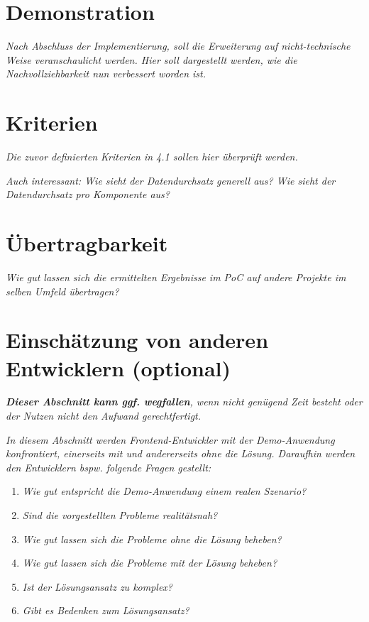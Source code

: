 
\section{Demonstration}

	\textit{Nach Abschluss der Implementierung, soll die Erweiterung auf nicht-technische Weise veranschaulicht werden. Hier soll dargestellt werden, wie die Nachvollziehbarkeit nun verbessert worden ist.}
	
\section{Kriterien}

	\textit{Die zuvor definierten Kriterien in 4.1 sollen hier überprüft werden.}

	\textit{Auch interessant: Wie sieht der Datendurchsatz generell aus? Wie sieht der Datendurchsatz pro Komponente aus?}
	
\section{Übertragbarkeit}
\label{sec:uebertragbarkeit}

	\textit{Wie gut lassen sich die ermittelten Ergebnisse im PoC auf andere Projekte im selben Umfeld übertragen?}
	
\section{Einschätzung von anderen Entwicklern (optional)}

	\textit{\textbf{Dieser Abschnitt kann ggf. wegfallen}, wenn nicht genügend Zeit besteht oder der Nutzen nicht den Aufwand gerechtfertigt.}
	
	\textit{In diesem Abschnitt werden Frontend-Entwickler mit der Demo-Anwendung konfrontiert, einerseits mit und andererseits ohne die Lösung. Daraufhin werden den Entwicklern bspw. folgende Fragen gestellt:}
	
	\begin{enumerate}
		\item \textit{Wie gut entspricht die Demo-Anwendung einem realen Szenario?}
		\item \textit{Sind die vorgestellten Probleme realitätsnah?}
		\item \textit{Wie gut lassen sich die Probleme ohne die Lösung beheben?}
		\item \textit{Wie gut lassen sich die Probleme mit der Lösung beheben?}
		\item \textit{Ist der Lösungsansatz zu komplex?}
		\item \textit{Gibt es Bedenken zum Lösungsansatz?}
	\end{enumerate}